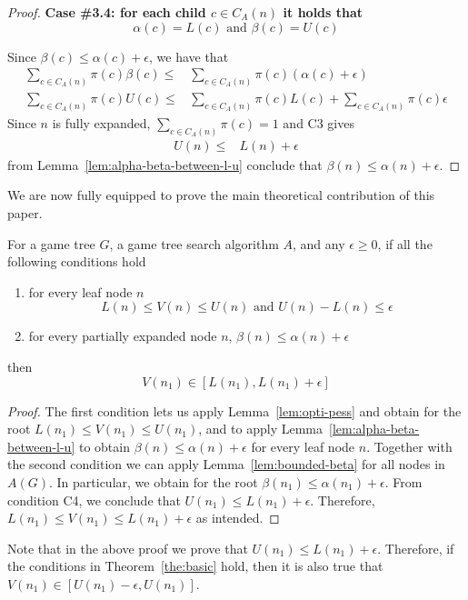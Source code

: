 \documentclass[runningheads]{llncs}
\newcommand{\MM}{\mathit{V}}
\newcommand{\pess}{\mathit{L}}
\newcommand{\opti}{\mathit{U}}
\newcommand{\rootnode}{\mathit{n_1}}
\begin{document}
\begin{proof}
\textbf{Case \#3.4: for each child $c\in C_A(n)$ it holds that
\[ \alpha(c)=\pess(c) \text{ and } \beta(c)=\opti(c)\]}

\noindent Since $\beta(c)\leq \alpha(c)+\epsilon$, we have that
\begin{align}
\sum_{c\in C_A(n)} \!\!\pi(c) \beta(c) \leq & \sum_{c\in C_A(n)} \pi(c)(\alpha(c) + \epsilon)\\
\sum_{c\in C_A(n)} \!\!\!\pi(c)\opti(c) \leq & \!\!\sum_{c\in C_A(n)} \!\!\!\!\pi(c)\pess(c) + \!\!\!\sum_{c\in C_A(n)} \!\!\!\!\pi(c)\epsilon \label{eq:opti-pess-eps}
\end{align}
Since $n$ is fully expanded, $\sum_{c\in C_A(n)} \pi(c) = 1$ and C3 gives
\begin{align}
\opti(n) \leq & \pess(n) + \epsilon \label{eq:opti-pess-eps}
\end{align}
from Lemma~\ref{lem:alpha-beta-between-l-u} conclude that $\beta(n) \leq \alpha(n) + \epsilon$.
\end{proof}


We are now fully equipped to prove the main theoretical contribution of this paper.

\begin{theorem}
For a game tree $G$, a game tree search algorithm $A$, 
and any $\epsilon\geq 0$, if all the following conditions hold
\begin{enumerate}
\item for every leaf node $n$
\[ \pess(n) \leq \MM(n) \leq \opti(n) \text{ and } \opti(n)-\pess(n)\leq \epsilon \]
\item for every partially expanded node $n$, 
$\beta(n) \leq \alpha(n)+\epsilon$
\end{enumerate}
then 
\[\MM(\rootnode)\in [\pess(\rootnode),\pess(\rootnode)+\epsilon]\]
\label{the:basic}
\end{theorem}
\begin{proof}
The first condition lets us apply Lemma~\ref{lem:opti-pess} and obtain for the root $\pess(n_1) \leq \MM(n_1) \leq \opti(n_1)$, and to apply Lemma~\ref{lem:alpha-beta-between-l-u} to obtain $\beta(n) \leq \alpha(n) + \epsilon$ for every leaf node $n$. 
Together with the second condition we can apply Lemma~\ref{lem:bounded-beta} for all nodes in $A(G)$.
In particular, we obtain for the root $\beta(n_1) \leq \alpha(n_1) + \epsilon$.
From condition C4, we conclude that $\opti(\rootnode)\leq \pess(\rootnode)+\epsilon$.
Therefore, $\pess(\rootnode) \leq \MM(\rootnode) \leq \pess(\rootnode) + \epsilon$ as intended.
\end{proof}
Note that in the above proof we prove that $\opti(\rootnode)\leq \pess(\rootnode)+\epsilon$. Therefore, if the conditions in Theorem~\ref{the:basic} hold, then it is also true that $\MM(\rootnode)\in [\opti(\rootnode)-\epsilon,\opti(\rootnode)]$. %
\end{document}
